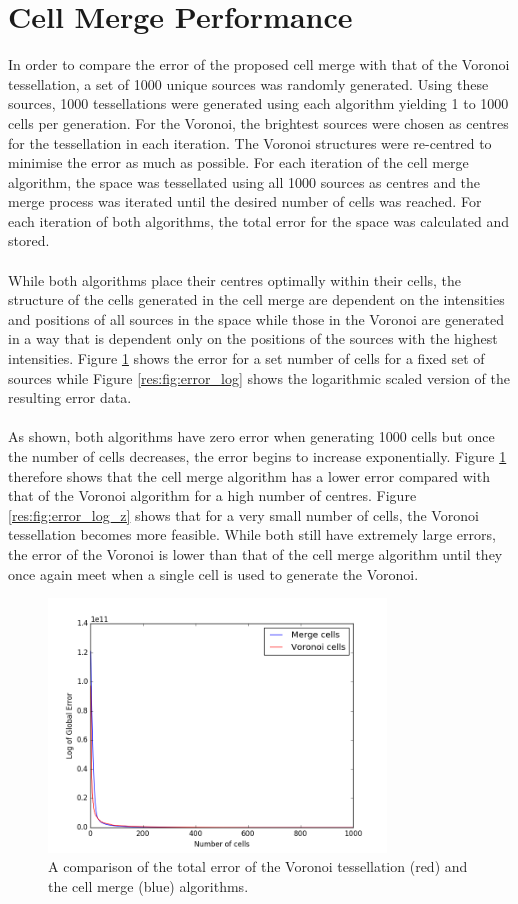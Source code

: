 \section{Cell Merge Performance}
In order to compare the error of the proposed cell merge with that of the Voronoi tessellation, a set of 1000 unique sources was randomly generated. Using these sources, 1000 tessellations were generated using each algorithm yielding 1 to 1000 cells per generation. For the Voronoi, the brightest sources were chosen as centres for the tessellation in each iteration. The Voronoi structures were re-centred to minimise the error as much as possible. For each iteration of the cell merge algorithm, the space was tessellated using all 1000 sources as centres and the merge process was iterated until the desired number of cells was reached. For each iteration of both algorithms, the total error for the space was calculated and stored.
\\
\\
While both algorithms place their centres optimally within their cells, the structure of the cells generated in the cell merge are dependent on the intensities and positions of all sources in the space while those in the Voronoi are generated in a way that is dependent only on the positions of the sources with the highest intensities. Figure \ref{res:fig:error} shows the error for a set number of cells for a fixed set of sources while Figure \ref{res:fig:error_log} shows the logarithmic scaled version of the resulting error data.
\\
\\
As shown, both algorithms have zero error when generating 1000 cells but once the number of cells decreases, the error begins to increase exponentially. Figure \ref{res:fig:error} therefore shows that the cell merge algorithm has a lower error compared with that of the Voronoi algorithm for a high number of centres. Figure \ref{res:fig:error_log_z} shows that for a very small number of cells, the Voronoi tessellation becomes more feasible. While both still have extremely large errors, the error of the Voronoi is lower than that of the cell merge algorithm until they once again meet when a single cell is used to generate the Voronoi.
\begin{figure}[H]
\centering
\includegraphics[width=0.8\textwidth]{Images/result_error.png}
\caption{A comparison of the total error of the Voronoi tessellation (red) and the cell merge (blue) algorithms.}
\label{res:fig:error}
\end{figure}
